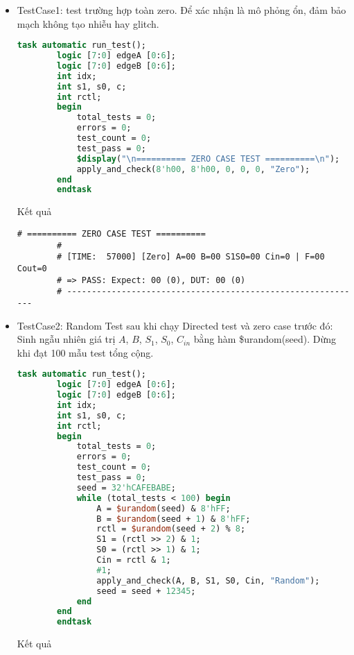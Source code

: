 \begin{itemize}[label=-]
	\item TestCase1: test trường hợp toàn zero. Để xác nhận là mô phỏng ổn, đảm bảo mạch không tạo nhiễu hay glitch.
	
	\begin{lstlisting}[style=StyleCode, language=SystemVerilog, caption={Thực hiện kiểm tra zero case.}]
		task automatic run_test();
		logic [7:0] edgeA [0:6];
		logic [7:0] edgeB [0:6];
		int idx;
		int s1, s0, c;
		int rctl;
		begin
			total_tests = 0;
			errors = 0;
			test_count = 0;
			test_pass = 0;
			$display("\n========== ZERO CASE TEST ==========\n");
			apply_and_check(8'h00, 8'h00, 0, 0, 0, "Zero");
		end
		endtask
	\end{lstlisting}
	
	Kết quả
	
	\begin{lstlisting}[style=StyleResult, language=Result, caption={Kết quả mô phỏng Directed Test.}]
		# ========== ZERO CASE TEST ==========
		# 
		# [TIME:  57000] [Zero] A=00 B=00 S1S0=00 Cin=0 | F=00 Cout=0
		# => PASS: Expect: 00 (0), DUT: 00 (0)
		# ------------------------------------------------------------
	\end{lstlisting}
	
	\item TestCase2: Random Test sau khi chạy Directed test và zero case trước đó: Sinh ngẫu nhiên giá trị $A$, $B$, $S_{1}$, $S_{0}$, $C_{in}$ bằng hàm \$urandom(seed). Dừng khi đạt 100 mẫu test tổng cộng.
	
	\begin{lstlisting}[style=StyleCode, language=SystemVerilog, caption={Thực hiện Random Test.}]
		task automatic run_test();
		logic [7:0] edgeA [0:6];
		logic [7:0] edgeB [0:6];
		int idx;
		int s1, s0, c;
		int rctl;
		begin
			total_tests = 0;
			errors = 0;
			test_count = 0;
			test_pass = 0;
			seed = 32'hCAFEBABE;
			while (total_tests < 100) begin
				A = $urandom(seed) & 8'hFF;
				B = $urandom(seed + 1) & 8'hFF;
				rctl = $urandom(seed + 2) % 8;
				S1 = (rctl >> 2) & 1;
				S0 = (rctl >> 1) & 1;
				Cin = rctl & 1;
				#1;
				apply_and_check(A, B, S1, S0, Cin, "Random");
				seed = seed + 12345;
			end
		end
		endtask
	\end{lstlisting}
	
	Kết quả 
	

\end{itemize}
